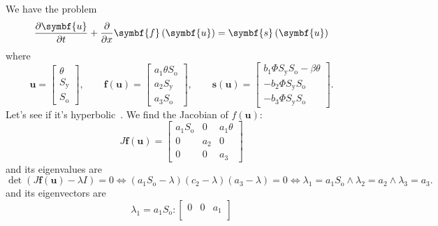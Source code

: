 \documentclass[
    8pt,
    aspectratio=1610,
    c,
    intlimits,
		handout,
    leqno,
    professionalfonts,
]{beamer}
\begin{document}
\begin{frame}
	We have the problem
	\begin{equation*}
		\diffp{\symbf{u}}{t}+
		\diffp{}{x}\symbf{f}\left(\symbf{u}\right)=
		\symbf{s}\left(\symbf{u}\right)
	\end{equation*}
	where
	\begin{equation*}
		\symbf{u}=
		\begin{bmatrix}
			\theta       \\
			S_{\text{y}} \\
			S_{\text{o}}
		\end{bmatrix},\qquad
		\symbf{f}\left(\symbf{u}\right)=
		\begin{bmatrix}
			a_{1}\theta S_{\text{o}} \\
			a_{2}S_{\text{y}}        \\
			a_{3}S_{\text{o}}
		\end{bmatrix},\qquad
		\symbf{s}\left(\symbf{u}\right)=
		\begin{bmatrix}
			b_{1} \Phi S_{\text{y}}S_{\text{o}}-\beta\theta \\
			-b_{2}\Phi S_{\text{y}}S_{\text{o}}             \\
			-b_{3}\Phi S_{\text{y}}S_{\text{o}}
		\end{bmatrix}.
	\end{equation*}
	Let's see if it's hyperbolic~\cite{Toro2024}.
	We find the Jacobian of $f\left(\symbf{u}\right)$:
	\begin{equation*}
		J\symbf{f}\left(\symbf{u}\right)=
		\begin{bmatrix}
			a_{1}S_{\text{o}} & 0     & a_{1} \theta \\
			0                 & a_{2} & 0            \\
			0                 & 0     & a_{3}
		\end{bmatrix}
	\end{equation*}
	and its eigenvalues are
	\begin{equation*}
		\det\left(J\symbf{f}\left(\symbf{u}\right)-\lambda I\right)=
		0\iff
		\left(a_{1}S_{\text{o}}-\lambda\right)
		\left(c_{2}-\lambda\right)
		\left(a_{3}-\lambda\right)=
		0\iff
		\lambda_{1}=
		a_{1}S_{\text{o}}\wedge
		\lambda_{2}=
		a_{2}\wedge
		\lambda_{3}=
		a_{3}.
	\end{equation*}
	and its eigenvectors are
	\begin{equation*}
		\lambda_{1}=
		a_{1}S_{\text{o}}:
		\begin{bmatrix}
			0 & 0                       & a_{1}                   \\

\end{bmatrix}
\end{equation*}
\end{frame}
\end{document}

